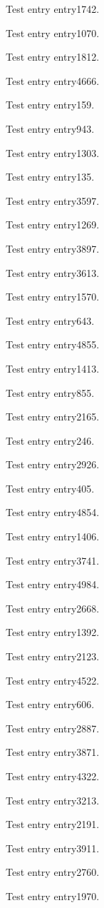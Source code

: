 Test entry \gls{entry1742}.

Test entry \gls{entry1070}.

Test entry \gls{entry1812}.

Test entry \gls{entry4666}.

Test entry \gls{entry159}.

Test entry \gls{entry943}.

Test entry \gls{entry1303}.

Test entry \gls{entry135}.

Test entry \gls{entry3597}.

Test entry \gls{entry1269}.

Test entry \gls{entry3897}.

Test entry \gls{entry3613}.

Test entry \gls{entry1570}.

Test entry \gls{entry643}.

Test entry \gls{entry4855}.

Test entry \gls{entry1413}.

Test entry \gls{entry855}.

Test entry \gls{entry2165}.

Test entry \gls{entry246}.

Test entry \gls{entry2926}.

Test entry \gls{entry405}.

Test entry \gls{entry4854}.

Test entry \gls{entry1406}.

Test entry \gls{entry3741}.

Test entry \gls{entry4984}.

Test entry \gls{entry2668}.

Test entry \gls{entry1392}.

Test entry \gls{entry2123}.

Test entry \gls{entry4522}.

Test entry \gls{entry606}.

Test entry \gls{entry2887}.

Test entry \gls{entry3871}.

Test entry \gls{entry4322}.

Test entry \gls{entry3213}.

Test entry \gls{entry2191}.

Test entry \gls{entry3911}.

Test entry \gls{entry2760}.

Test entry \gls{entry1970}.

